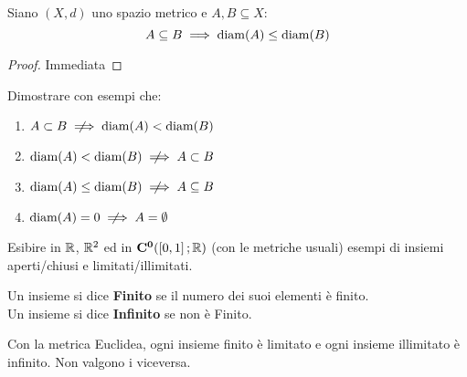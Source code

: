 \begin{proposition}
	Siano $(X,d)$ uno spazio metrico e $A,B\subseteq X$:
	\[A \subseteq B \implies \operatorname{diam}(A) \leq \operatorname{diam}(B)\]
	\begin{proof}
		Immediata %
	\end{proof}
\end{proposition}
\begin{exercise}
	Dimostrare con esempi che:
	\begin{enumerate}
		\item $A \subset B \notimplies \diam(A) < \diam(B)$
		\item $\diam(A) < \diam(B) \notimplies A \subset B$
		\item $\diam(A) \leq \diam(B) \notimplies A \subseteq B$
		\item $\diam(A) = 0 \notimplies A = \emptyset$ %
	\end{enumerate}
\end{exercise}
\begin{exercise}
	Esibire in $\mathbb{R}$, $\mathbb{R}^2$ ed in $\mathbf{C^{0}}(\left[0,1\right]; \mathbb{R})$ (con le metriche usuali) esempi di insiemi aperti/chiusi e limitati/illimitati.
\end{exercise}

\begin{definition}
	Un insieme si dice \textbf{Finito} se il numero dei suoi elementi è finito.\\
	Un insieme si dice \textbf{Infinito} se non è Finito.
\end{definition}
\begin{observation}
	Con la metrica Euclidea, ogni insieme finito è limitato e ogni insieme illimitato è infinito. Non valgono i viceversa.
\end{observation}

\newpage
